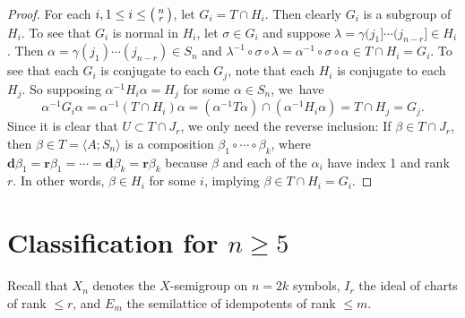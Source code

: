 \documentclass{surv-l}
\numberwithin{equation}{section}
\numberwithin{table}{section}
\numberwithin{figure}{section}
\theoremstyle{plain}
\theoremstyle{definition}
\begin{document}
\begin{proof} For each $i,  1\leq i\leq \big(\kern0.5pt\begin{smallmatrix}
n\\
r \end{smallmatrix}\kern0.5pt\big)$, let $G_{i}=T\cap H_{i}$. Then clearly
$G_{i}$ is a subgroup of $H_{i}$. To see that $G_{i}$ is normal in
$H_{i}$, let $\sigma\in G_{i}$ and suppose
$\lambda=\gamma(j_{1}]\cdots(j_{n-r}]\in H_{i}$. Then
$\alpha=\gamma(j_{1})\cdots(j_{n-r})\in S_{n}$ and
$\lambda^{-1}\circ\sigma \circ\lambda= \alpha^{-1}\circ\sigma
\circ\alpha\in T\cap H_{i}=G_{i}$. To see that each $G_{i}$ is
conjugate to each $G_{j}$, note that each $H_{i}$ is conjugate to
each $H_{j}$. So supposing $\alpha^{-1}H_{i}\alpha=H_{j}$ for some
$\alpha\in S_{n}$, we~have
\[
\alpha^{-1}G_{i}\alpha=\alpha^{-1}(T\cap
H_{i})\alpha=(\alpha^{-1}T\alpha)\cap(\alpha^{-1}H_{i}\alpha)=T\cap
H_{j}=G_{j}.
\]
Since it is clear that $U\subset T\cap J_{r}$, we only need the
reverse inclusion: If $\beta\in T\cap J_{r}$, then $\beta\in
T=\langle A;S_{n}\rangle$ is a composition $\beta_{1}\circ\cdots
\circ\beta_{k}$, where
$\mathbf{d}\beta_{1}=\mathbf{r}\beta_{1}=\cdots=\mathbf{d}\beta_{k}=\mathbf{r}\beta_{k}$
because $\beta$ and each of the $\alpha_{i}$ have index 1 and
rank~$r$. In other words, $\beta\in H_{i}$ for some $i$, implying
$\beta\in T\cap H_{i}=G_{i}.$
\end{proof}

\section{Classification for $n \geq 5$}\label{sec7.33}

Recall that $X_{n}$ denotes the $X$-semigroup on $n=2k$ symbols,
$I_{r}$ the ideal of charts of rank $\leq r$, and $E_{m}$ the
semilattice of idempotents of rank $\leq m$.
\end{document}
